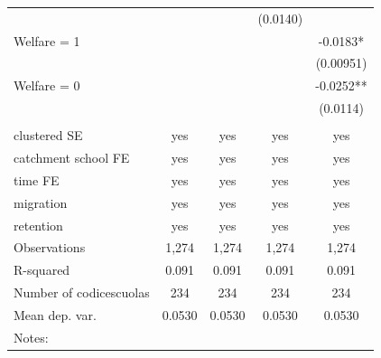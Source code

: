 \documentclass[12pt]{article}
\theoremstyle{plain}
\theoremstyle{plain}
\theoremstyle{plain}
\theoremstyle{definition}
\theoremstyle{plain}
\theoremstyle{definition}
\theoremstyle{plain}
\theoremstyle{remark}
\theoremstyle{definition}
\theoremstyle{definition}
\theoremstyle{plain}
\begin{document}
\begin{table}[H]
{\begin{tabular}{p{12.39em}llll}
			\multicolumn{1}{l}{} & \multicolumn{1}{c}{} & \multicolumn{1}{c}{} & \multicolumn{1}{c}{(0.0140)} & \multicolumn{1}{c}{} \\
			\multicolumn{1}{l}{Welfare = 1} & \multicolumn{1}{c}{} & \multicolumn{1}{c}{} & \multicolumn{1}{c}{} & \multicolumn{1}{c}{-0.0183*} \\
			\multicolumn{1}{l}{} & \multicolumn{1}{c}{} & \multicolumn{1}{c}{} & \multicolumn{1}{c}{} & \multicolumn{1}{c}{(0.00951)} \\
			\multicolumn{1}{l}{Welfare = 0} & \multicolumn{1}{c}{} & \multicolumn{1}{c}{} & \multicolumn{1}{c}{} & \multicolumn{1}{c}{-0.0252**} \\
			\multicolumn{1}{l}{} & \multicolumn{1}{c}{} & \multicolumn{1}{c}{} & \multicolumn{1}{c}{} & \multicolumn{1}{c}{(0.0114)} \\
			\multicolumn{1}{l}{} & \multicolumn{1}{c}{} & \multicolumn{1}{c}{} & \multicolumn{1}{c}{} & \multicolumn{1}{c}{} \\
			\multicolumn{1}{l}{clustered SE} & \multicolumn{1}{c}{yes} & \multicolumn{1}{c}{yes} & \multicolumn{1}{c}{yes} & \multicolumn{1}{c}{yes} \\
			\multicolumn{1}{l}{catchment school FE} & \multicolumn{1}{c}{yes} & \multicolumn{1}{c}{yes} & \multicolumn{1}{c}{yes} & \multicolumn{1}{c}{yes} \\
			\multicolumn{1}{l}{time FE} & \multicolumn{1}{c}{yes} & \multicolumn{1}{c}{yes} & \multicolumn{1}{c}{yes} & \multicolumn{1}{c}{yes} \\
			\multicolumn{1}{l}{migration} & \multicolumn{1}{c}{yes} & \multicolumn{1}{c}{yes} & \multicolumn{1}{c}{yes} & \multicolumn{1}{c}{yes} \\
			\multicolumn{1}{l}{retention} & \multicolumn{1}{c}{yes} & \multicolumn{1}{c}{yes} & \multicolumn{1}{c}{yes} & \multicolumn{1}{c}{yes} \\
			\multicolumn{1}{l}{Observations} & \multicolumn{1}{c}{1,274} & \multicolumn{1}{c}{1,274} & \multicolumn{1}{c}{1,274} & \multicolumn{1}{c}{1,274} \\
			\multicolumn{1}{l}{R-squared} & \multicolumn{1}{c}{0.091} & \multicolumn{1}{c}{0.091} & \multicolumn{1}{c}{0.091} & \multicolumn{1}{c}{0.091} \\
			\multicolumn{1}{l}{Number of codicescuolas} & \multicolumn{1}{c}{234} & \multicolumn{1}{c}{234} & \multicolumn{1}{c}{234} & \multicolumn{1}{c}{234} \\
			\multicolumn{1}{l}{Mean dep. var.} & \multicolumn{1}{c}{0.0530} & \multicolumn{1}{c}{0.0530} & \multicolumn{1}{c}{0.0530} & \multicolumn{1}{c}{0.0530} \\
			\midrule
			\multicolumn{5}{p{32.39em}}{Notes:} \\
		\end{tabular}%
	}
\end{table}
\FloatBarrier 
\end{document}
